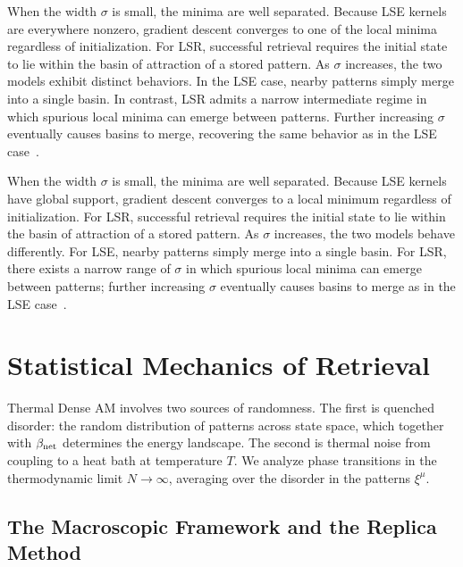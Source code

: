 \documentclass{article}
\theoremstyle{plain}
\theoremstyle{definition}
\theoremstyle{remark}
\begin{document}
When the width $\sigma$ is small, the minima are well separated. Because LSE kernels are everywhere nonzero, gradient descent converges to one of the local minima regardless of initialization. For LSR, successful retrieval requires the initial state to lie within the basin of attraction of a stored pattern. As $\sigma$ increases, the two models exhibit distinct behaviors. In the LSE case, nearby patterns simply merge into a single basin. In contrast, LSR admits a narrow intermediate regime in which spurious local minima can emerge between patterns. Further increasing $\sigma$ eventually causes basins to merge, recovering the same behavior as in the LSE case~\cite{hoover2025dense}.

When the width $\sigma$ is small, the minima are well separated. Because LSE kernels have global support, gradient descent converges to a local minimum regardless of initialization. For LSR, successful retrieval requires the initial state to lie within the basin of attraction of a stored pattern. As $\sigma$ increases, the two models behave differently. For LSE, nearby patterns simply merge into a single basin. For LSR, there exists a narrow range of $\sigma$ in which spurious local minima can emerge between patterns; further increasing $\sigma$ eventually causes basins to merge as in the LSE case~\citep{hoover2025dense}.


\section{Statistical Mechanics of Retrieval}

Thermal Dense AM involves two sources of randomness. The first is quenched disorder: the random distribution of patterns across state space, which together with $\beta_{\rm net}$ determines the energy landscape. The second is thermal noise from coupling to a heat bath at temperature $T$. We analyze phase transitions in the thermodynamic limit $N \to \infty$, averaging over the disorder in the patterns $\xi^\mu$.

\subsection{The Macroscopic Framework and the Replica Method}
\end{document}
